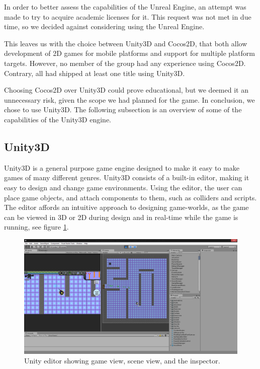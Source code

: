 In order to better assess the capabilities of the Unreal Engine, an attempt was made to try to acquire academic licenses for it.
This request was not met in due time, so we decided against considering using the Unreal Engine.

This leaves us with the choice between Unity3D and Cocos2D, that both allow development of 2D games for mobile platforms and support for multiple platform targets.
However, no member of the group had any experience using Cocos2D.
Contrary, all had shipped at least one title using Unity3D.

Choosing Cocos2D over Unity3D could prove educational, but we deemed it an unnecessary risk, given the scope we had planned for the game.
In conclusion, we chose to use Unity3D. The following subsection is an overview of some of the capabilities of the Unity3D engine.

\subsection{Unity3D}
Unity3D is a general purpose game engine designed to make it easy to make games
of many different genres. Unity3D consists of a built-in editor, making it
easy to design and change game environments. Using the editor, the user can
place game objects, and attach components to them, such as colliders and
scripts. The editor affords an intuitive approach to designing game-worlds, as
the game can be viewed in 3D or 2D during design and in real-time while the
game is running, see figure \ref{platform:editor}.

\begin{figure}[H]
\begin{center}
	\includegraphics[width=\textwidth]{figures/architecture/editor.png}
	\caption{Unity editor showing game view, scene view, and the inspector.}
	\label{platform:editor}
\end{center}
\end{figure}

